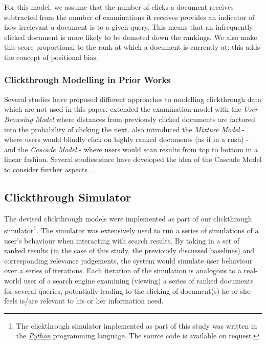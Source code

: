 For this model, we assume that the number of clicks a document receives subtracted from the number of examinations it receives provides an indicator of how irrelevant a document is to a given query. This means that an infrequently clicked document is more likely to be demoted down the rankings. We also make this score proportional to the rank at which a document is currently at: this adds the concept of positional bias.

\subsubsection{Clickthrough Modelling in Prior Works}
Several studies have proposed different approaches to modelling clickthrough data which are not used in this paper. \citeauthor{dupret2008user_browsing_model} \cite{dupret2008user_browsing_model} extended the examination model with the \emph{User Browsing Model} where distances from previously clicked documents are factored into the probability of clicking the next. \citeauthor{craswell2008click_position_bias_models} \cite{craswell2008click_position_bias_models} also introduced the \emph{Mixture Model} - where users would blindly click on highly ranked documents (as if in a rush) - and the \emph{Cascade Model} - where users would scan results from top to bottom in a linear fashion. Several studies since have developed the idea of the Cascade Model to consider further aspects \cite{chapelle2009bayesian, guo2009click_chain, guo2009multiple_click_models}.

\subsection{Clickthrough Simulator}\label{method:simulator:clickthrough}
The devised clickthrough models were implemented as part of our clickthrough simulator\footnote{The clickthrough simulator implemented as part of this study was written in the \href{http://www.python.org/download/releases/2.7/}{\emph{Python}} programming language. The source code is available on request.}. The simulator was extensively used to run a series of simulations of a user's behaviour when interacting with search results. By taking in a set of ranked results (in the case of this study, the previously discussed baselines) and corresponding relevance judgements, the system would simulate user behaviour over a series of iterations. Each iteration of the simulation is analogous to a real-world user of a search engine examining (viewing) a series of ranked documents for several queries, potentially leading to the clicking of document(s) he or she feels is/are relevant to his or her information need.

